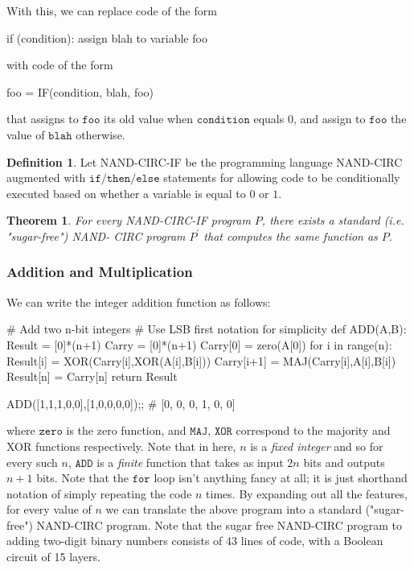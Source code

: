 \documentclass[a4paper, 12pt]{report}
\newtheorem{theorem}{Theorem}[section]
\theoremstyle{remark}
\theoremstyle{definition}
\newtheorem{definition}{Definition}[section]
\begin{document}
With this, we can replace code of the form 
\begin{python}
if (condition): assign blah to variable foo
\end{python}
with code of the form 
\begin{python}
foo = IF(condition, blah, foo) 
\end{python}
that assigns to $\texttt{foo}$ its old value when $\texttt{condition}$ equals $0$, and assign to $\texttt{foo}$ the value of $\texttt{blah}$ otherwise.

\begin{definition}
Let NAND-CIRC-IF be the programming language NAND-CIRC augmented with $\texttt{if/then/else}$ statements for allowing code to be conditionally executed based on whether a variable is equal to $0$ or $1$. 
\end{definition}

\begin{theorem}
For every NAND-CIRC-IF program $P$, there exists a standard (i.e. "sugar-free") NAND- CIRC program $P^\prime$ that computes the same function as $P$. 
\end{theorem}

\subsubsection{Addition and Multiplication}
We can write the integer addition function as follows: 
\begin{python}
# Add two n-bit integers
# Use LSB first notation for simplicity 
def ADD(A,B):
    Result = [0]*(n+1) 
    Carry = [0]*(n+1) 
    Carry[0] = zero(A[0]) 
    for i in range(n):
        Result[i] = XOR(Carry[i],XOR(A[i],B[i]))
        Carry[i+1] = MAJ(Carry[i],A[i],B[i]) Result[n] = Carry[n]
    return Result
    
ADD([1,1,1,0,0],[1,0,0,0,0]);; 
# [0, 0, 0, 1, 0, 0]
\end{python}
where $\texttt{zero}$ is the zero function, and $\texttt{MAJ, XOR}$ correspond to the majority and XOR functions respectively. Note that in here, $n$ is a \textit{fixed integer} and so for every such $n$, $\texttt{ADD}$ is a \textit{finite} function that takes as input $2n$ bits and outputs $n+1$ bits. Note that the $\texttt{for}$ loop isn't anything fancy at all; it is just shorthand notation of simply repeating the code $n$ times. By expanding out all the features, for every value of $n$ we can translate the above program into a standard ("sugar-free") NAND-CIRC program. Note that the sugar free NAND-CIRC program to adding two-digit binary numbers consists of 43 lines of code, with a Boolean circuit of 15 layers. 
\end{document}
